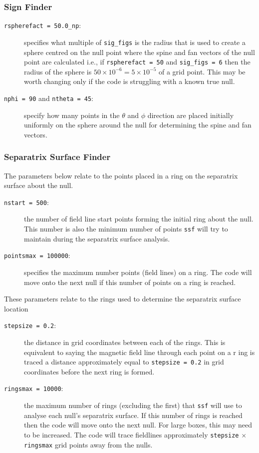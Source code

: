 \documentclass[12pt]{article}
\begin{document}
      \subsubsection{Sign Finder}
        \begin{description}
          \item [\texttt{rspherefact = 50.0\_np}:] specifies what multiple of \texttt{sig\_figs} is the radius that is used to create a sphere centred on the null point where the spine and fan vectors of the null point are calculated i.e., if \texttt{rspherefact = 50} and \texttt{sig\_figs = 6} then the radius of the sphere is  \( 50 \times 10^{-6} = 5\times 10^{-5} \) of a grid point. This may be worth changing only if the code is struggling with a known true null.
          \item [\texttt{nphi = 90} and \texttt{ntheta = 45}:] specify how many points in the \( \theta \) and \( \phi \) direction are placed initially uniformly on the sphere around the null for determining the spine and fan vectors.
        \end{description}

      \subsubsection{Separatrix Surface Finder}
        The parameters below relate to the points placed in a ring on the separatrix surface about the null.
        \begin{description}
          \item [\texttt{nstart = 500}:] the number of field line start points forming the initial ring about the null. This number is also the minimum number of points \texttt{ssf} will try to maintain during the separatrix surface analysis.
          \item [\texttt{pointsmax = 100000}:] specifies the maximum number points (field lines) on a ring. The code will move onto the next null if this number of points on a ring is reached.
        \end{description}
        
        These parameters relate to the rings used to determine the separatrix surface location
        
        \begin{description}
          \item [\texttt{stepsize = 0.2}:] the distance in grid coordinates between each of the rings. This is equivalent to saying the magnetic field line through each point on a r     ing is traced a distance approximately equal to \texttt{stepsize = 0.2} in grid coordinates before the next ring is formed.
          \item [\texttt{ringsmax = 10000}:] the maximum number of rings (excluding the first) that \texttt{ssf} will use to analyse each null's separatrix surface. If this number of rings is reached then the code will move onto the next null. For large boxes, this may need to be increased. The code will trace fieldlines approximately \texttt{stepsize} \( \times \) \texttt{ringsmax} grid points away from the nulls.
        \end{description}
        
\end{document}
